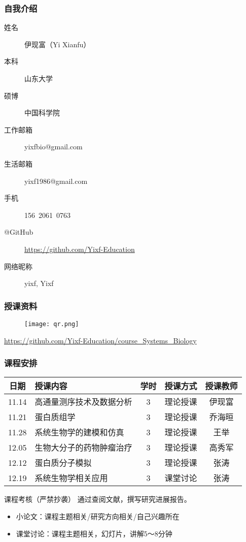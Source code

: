 \begin{frame}
  \frametitle{自我介绍}
    \begin{description}
      \item[姓\qquad 名]伊现富（Yi Xianfu）
      \item[本\qquad 科]山东大学
      \item[硕\qquad 博]中国科学院
      \item[工作邮箱]\alert{yixfbio@gmail.com}
      \item[生活邮箱]yixf1986@gmail.com
      \item[手\qquad 机]\alert{156\ 2061\ 0763}
      \item[@GitHub]\alert{\href{https://github.com/Yixf-Education}{https://github.com/Yixf-Education}}
      \item[网络昵称]yixf, Yixf
    \end{description}
\end{frame}

\begin{frame}
  \frametitle{授课资料}
  \begin{figure}
    \centering
    \texttt{[image: qr.png]}
  \end{figure}
  \begin{center}
  \href{https://github.com/Yixf-Education/course_Systems_Biology}{https://github.com/Yixf-Education/course\_Systems\_Biology}
  \end{center}
\end{frame}

\begin{frame}
  \frametitle{课程安排}
  \begin{table}
    \centering
    \begin{tabular}{clccc}
      \hline
      \rowcolor{blue!50}日期 & 授课内容 & 学时 & 授课方式 & 授课教师\\
      \hline
      11.14 & 高通量测序技术及数据分析 & 3 & 理论授课 & 伊现富\\
      11.21 & 蛋白质组学 & 3 & 理论授课 & 乔海晅\\
      11.28 & 系统生物学的建模和仿真 & 3 & 理论授课 & 王举\\
      12.05 & 生物大分子的药物肿瘤治疗 & 3 & 理论授课 & 高秀军\\
      12.12 & 蛋白质分子模拟 & 3 & 理论授课 & 张涛\\
      12.19 & 系统生物学相关应用 & 3 & 课堂讨论 & 张涛\\
      \hline
    \end{tabular}
  \end{table}
  \vspace{-1em}
  \begin{block}{课程考核（\alert{严禁抄袭}）}
    通过查阅文献，撰写研究进展报告。
    \begin{itemize}
      \item 小论文：课程主题相关/研究方向相关/自己兴趣所在
      \item 课堂讨论：课程主题相关，幻灯片，讲解5～8分钟
    \end{itemize}
  \end{block}
\end{frame}
